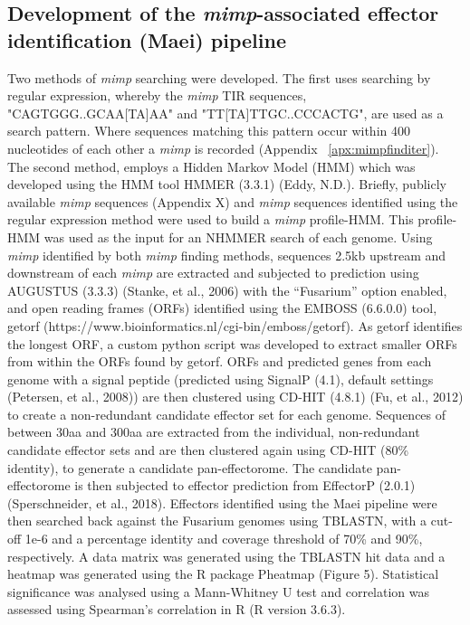 \subsection{Development of the \textit{mimp}-associated effector identification (Maei) pipeline}
Two methods of \textit{mimp} searching were developed. The first uses searching by regular expression, whereby the \textit{mimp} TIR sequences, "CAGTGGG..GCAA[TA]AA" and "TT[TA]TTGC..CCCACTG", are used as a search pattern. Where sequences matching this pattern occur within 400 nucleotides of each other a \textit{mimp} is recorded (Appendix ~\ref{apx:mimpfinditer}). The second method, employs a Hidden Markov Model (HMM) which was developed using the HMM tool HMMER (3.3.1) (Eddy, N.D.). Briefly, publicly available \textit{mimp} sequences (Appendix X) and \textit{mimp} sequences identified using the regular expression method were used to build a \textit{mimp} profile-HMM. This profile-HMM was used as the input for an NHMMER search of each genome.
Using \textit{\textit{mimp}} identified by both \textit{mimp} finding methods, sequences 2.5kb upstream and downstream of each \textit{mimp} are extracted and subjected to prediction using AUGUSTUS (3.3.3) (Stanke, et al., 2006) with the “Fusarium” option enabled, and open reading frames (ORFs) identified using the EMBOSS (6.6.0.0) tool, getorf (https://www.bioinformatics.nl/cgi-bin/emboss/getorf). As getorf identifies the longest ORF, a custom python script was developed to extract smaller ORFs from within the ORFs found by getorf.  ORFs and predicted genes from each genome with a signal peptide (predicted using SignalP (4.1), default settings (Petersen, et al., 2008)) are then clustered using CD-HIT (4.8.1) (Fu, et al., 2012) to create a non-redundant candidate effector set for each genome. Sequences of between 30aa and 300aa are extracted from the individual, non-redundant candidate effector sets and are then clustered again using CD-HIT (80\% identity), to generate a candidate pan-effectorome. The candidate pan-effectorome is then subjected to effector prediction from EffectorP (2.0.1) (Sperschneider, et al., 2018). 
Effectors identified using the Maei pipeline were then searched back against the Fusarium genomes using TBLASTN, with a cut-off 1e-6 and a percentage identity and coverage threshold of 70\% and 90\%, respectively. A data matrix was generated using the TBLASTN hit data and a heatmap was generated using the R package Pheatmap (Figure 5). Statistical significance was analysed using a Mann-Whitney U test and correlation was assessed using Spearman’s correlation in R (R version 3.6.3). 

